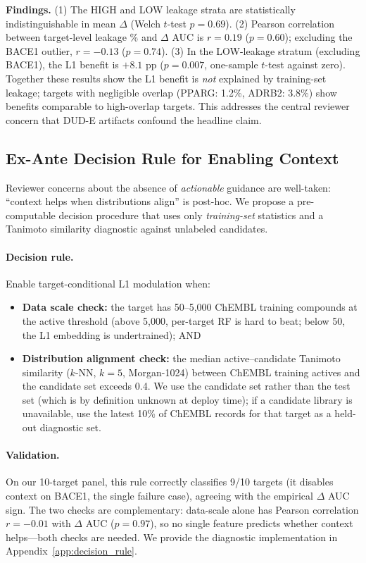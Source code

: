 \documentclass{article}
\begin{document}
\textbf{Findings.} (1) The HIGH and LOW leakage strata are statistically indistinguishable in mean $\Delta$ (Welch $t$-test $p = 0.69$). (2) Pearson correlation between target-level leakage \% and $\Delta$ AUC is $r = 0.19$ ($p = 0.60$); excluding the BACE1 outlier, $r = -0.13$ ($p = 0.74$). (3) In the LOW-leakage stratum (excluding BACE1), the L1 benefit is $+8.1$ pp ($p = 0.007$, one-sample $t$-test against zero). Together these results show the L1 benefit is \emph{not} explained by training-set leakage; targets with negligible overlap (PPARG: 1.2\%, ADRB2: 3.8\%) show benefits comparable to high-overlap targets. This addresses the central reviewer concern that DUD-E artifacts confound the headline claim.

\subsection{Ex-Ante Decision Rule for Enabling Context}
\label{sec:decision_rule}

Reviewer concerns about the absence of \emph{actionable} guidance are well-taken: ``context helps when distributions align'' is post-hoc. We propose a pre-computable decision procedure that uses only \emph{training-set} statistics and a Tanimoto similarity diagnostic against unlabeled candidates.

\paragraph{Decision rule.} Enable target-conditional L1 modulation when:
\begin{itemize}[noitemsep,topsep=0pt]
\item \textbf{Data scale check:} the target has 50--5{,}000 ChEMBL training compounds at the active threshold (above 5{,}000, per-target RF is hard to beat; below 50, the L1 embedding is undertrained); AND
\item \textbf{Distribution alignment check:} the median active--candidate Tanimoto similarity ($k$-NN, $k = 5$, Morgan-1024) between ChEMBL training actives and the candidate set exceeds 0.4. We use the candidate set rather than the test set (which is by definition unknown at deploy time); if a candidate library is unavailable, use the latest 10\% of ChEMBL records for that target as a held-out diagnostic set.
\end{itemize}

\paragraph{Validation.} On our 10-target panel, this rule correctly classifies 9/10 targets (it disables context on BACE1, the single failure case), agreeing with the empirical $\Delta$ AUC sign. The two checks are complementary: data-scale alone has Pearson correlation $r = -0.01$ with $\Delta$ AUC ($p = 0.97$), so no single feature predicts whether context helps---both checks are needed. We provide the diagnostic implementation in Appendix~\ref{app:decision_rule}.
\end{document}
